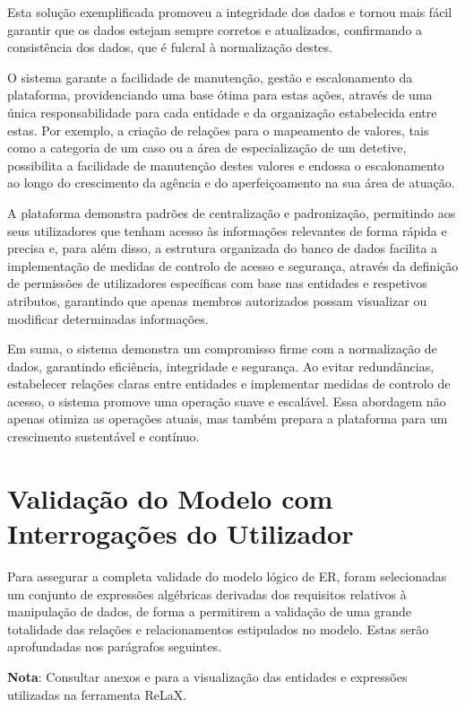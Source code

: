 \documentclass[a4paper,12pt]{scrreprt}
\begin{document}
        Esta solução exemplificada promoveu a integridade dos dados e tornou mais fácil garantir que os dados estejam sempre corretos e atualizados, confirmando a consistência dos dados, que é fulcral à normalização destes.

        O sistema garante a facilidade de manutenção, gestão e escalonamento da plataforma, providenciando uma base ótima para estas ações, através de uma única responsabilidade para cada entidade e da organização estabelecida entre estas. Por exemplo, a criação de relações para o mapeamento de valores, tais como a categoria de um caso ou a área de especialização de um detetive, possibilita a facilidade de manutenção destes valores e endossa o escalonamento ao longo do crescimento da agência e do aperfeiçoamento na sua área de atuação.

        A plataforma demonstra padrões de centralização e padronização, permitindo aos seus utilizadores que tenham acesso às informações relevantes de forma rápida e precisa e, para além disso, a estrutura organizada do banco de dados facilita a implementação de medidas de controlo de acesso e segurança, através da definição de permissões de utilizadores específicas com base nas entidades e respetivos atributos, garantindo que apenas membros autorizados possam visualizar ou modificar determinadas informações.

        Em suma, o sistema demonstra um compromisso firme com a normalização de dados, garantindo eficiência, integridade e segurança. Ao evitar redundâncias, estabelecer relações claras entre entidades e implementar medidas de controlo de acesso, o sistema promove uma operação suave e escalável. Essa abordagem não apenas otimiza as operações atuais, mas também prepara a plataforma para um crescimento sustentável e contínuo.


    \clearpage
    \section{Validação do Modelo com Interrogações do Utilizador}
        Para assegurar a completa validade do modelo lógico de ER, foram selecionadas um conjunto de expressões algébricas derivadas dos requisitos relativos à manipulação de dados, de forma a permitirem a validação de uma grande totalidade das relações e relacionamentos estipulados no modelo. Estas serão aprofundadas nos parágrafos seguintes.

        \textbf{Nota}: Consultar anexos  e  para a visualização das entidades e expressões utilizadas na ferramenta ReLaX.
\end{document}
